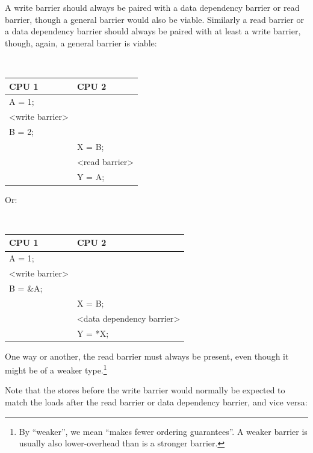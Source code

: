 A write barrier should always be paired with a data dependency barrier or read
barrier, though a general barrier would also be viable.  Similarly a read
barrier or a data dependency barrier should always be paired with at least a
write barrier, though, again, a general barrier is viable:

\vspace{5pt}
\begin{minipage}[t]{\columnwidth}
\tt
\scriptsize
\begin{tabular}{l|p{1.5in}}
	CPU 1 &		CPU 2 \\
	\hline
	A = 1; & \\
	<write barrier> & \\
	B = 2;	&	\\
		&	X = B; \\
		&	<read barrier> \\
		&	Y = A; \\
\end{tabular}
\end{minipage}
\vspace{5pt}

Or:

\vspace{5pt}
\begin{minipage}[t]{\columnwidth}
\tt
\scriptsize
\begin{tabular}{l|p{1.5in}}
	CPU 1 &		CPU 2 \\
	\hline
	A = 1; & \\
	<write barrier> & \\
	B = \&A; &	\\
		&	X = B; \\
		&	<data dependency barrier> \\
		&	Y = *X; \\
\end{tabular}
\end{minipage}
\vspace{5pt}

One way or another, the read barrier must always be present, even though
it might be of a weaker type.\footnote{
	By ``weaker'', we mean ``makes fewer ordering guarantees''.
	A weaker barrier is usually also lower-overhead than is a
	stronger barrier.}

Note that the stores before the write barrier would normally be expected to
match the loads after the read barrier or data dependency barrier, and vice
versa:

\begin{center}
\end{center}

